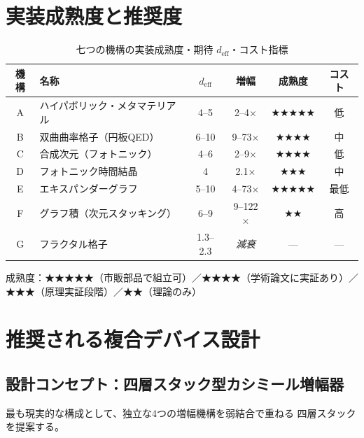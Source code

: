 \documentclass[11pt,a4paper]{article}
\newcommand{\deff}{d_{\mathrm{eff}}}
\begin{document}
\section{実装成熟度と推奨度}

\begin{table}[h]
\centering
\caption{七つの機構の実装成熟度・期待 $\deff$・コスト指標}
\label{tab:summary}
\small
\begin{tabular}{clcccc}
\toprule
機構 & 名称 & $\deff$ & 増幅 & 成熟度 & コスト \\
\midrule
A & ハイパボリック・メタマテリアル & 4--5 & 2--4$\times$ & ★★★★★ & 低 \\
B & 双曲曲率格子（円板QED）         & 6--10 & 9--73$\times$ & ★★★★ & 中 \\
C & 合成次元（フォトニック）        & 4--6 & 2--9$\times$ & ★★★★ & 低 \\
D & フォトニック時間結晶            & 4    & 2.1$\times$  & ★★★ & 中 \\
E & エキスパンダーグラフ            & 5--10 & 4--73$\times$ & ★★★★★ & 最低 \\
F & グラフ積（次元スタッキング）    & 6--9 & 9--122$\times$ & ★★ & 高 \\
G & フラクタル格子                  & 1.3--2.3 & \emph{減衰} & — & — \\
\bottomrule
\end{tabular}
\end{table}

成熟度：★★★★★（市販部品で組立可）／★★★★（学術論文に実証あり）／★★★（原理実証段階）／★★（理論のみ）

\section{推奨される複合デバイス設計}

\subsection{設計コンセプト：四層スタック型カシミール増幅器}

最も現実的な構成として、独立な4つの増幅機構を弱結合で重ねる
四層スタックを提案する。
\end{document}

